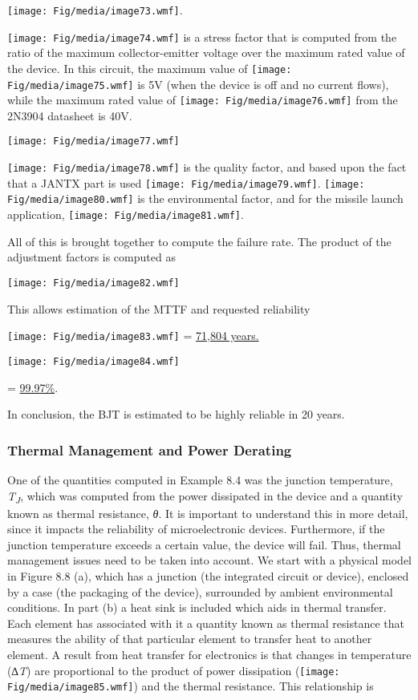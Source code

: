 \texttt{[image: Fig/media/image73.wmf]}.

\texttt{[image: Fig/media/image74.wmf]} is a stress factor that is
computed from the ratio of the maximum collector-emitter voltage over
the maximum rated value of the device. In this circuit, the maximum
value of \texttt{[image: Fig/media/image75.wmf]} is 5V (when the device
is off and no current flows), while the maximum rated value of
\texttt{[image: Fig/media/image76.wmf]} from the 2N3904 datasheet is
40V.

\texttt{[image: Fig/media/image77.wmf]}

\texttt{[image: Fig/media/image78.wmf]} is the quality factor, and based
upon the fact that a JANTX part is used
\texttt{[image: Fig/media/image79.wmf]}.
\texttt{[image: Fig/media/image80.wmf]} is the environmental factor, and
for the missile launch application,
\texttt{[image: Fig/media/image81.wmf]}.

All of this is brought together to compute the failure rate. The product
of the adjustment factors is computed as

\texttt{[image: Fig/media/image82.wmf]}

This allows estimation of the MTTF and requested reliability

\texttt{[image: Fig/media/image83.wmf]} = \ul{71,804 years.}

\texttt{[image: Fig/media/image84.wmf]}

= \ul{99.97\%}.

In conclusion, the BJT is estimated to be highly reliable in 20 years.

\subsubsection{Thermal Management and Power
Derating}\label{thermal-management-and-power-derating}

One of the quantities computed in Example 8.4 was the junction
temperature, \emph{T\textsubscript{J}}, which was computed from the
power dissipated in the device and a quantity known as thermal
resistance, \emph{θ}. It is important to understand this in more detail,
since it impacts the reliability of microelectronic devices.
Furthermore, if the junction temperature exceeds a certain value, the
device will fail. Thus, thermal management issues need to be taken into
account. We start with a physical model in Figure 8.8 (a), which has a
junction (the integrated circuit or device), enclosed by a case (the
packaging of the device), surrounded by ambient environmental
conditions. In part (b) a heat sink is included which aids in thermal
transfer. Each element has associated with it a quantity known as
thermal resistance that measures the ability of that particular element
to transfer heat to another element. A result from heat transfer for
electronics is that changes in temperature (∆\emph{T}) are proportional
to the product of power dissipation
(\texttt{[image: Fig/media/image85.wmf]}) and the thermal resistance.
This relationship is

